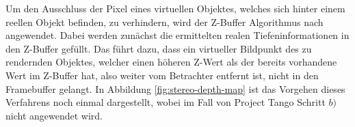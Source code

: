 Um den Ausschluss der Pixel eines virtuellen Objektes, welches sich hinter einem reellen Objekt befinden, zu verhindern, wird der Z-Buffer Algorithmus nach \citet{greene1993hierarchical} angewendet. Dabei werden zunächst die ermittelten realen Tiefeninformationen in den Z-Buffer gefüllt. Das führt dazu, dass ein virtueller Bildpunkt des zu rendernden Objektes, welcher einen höheren Z-Wert als der bereits vorhandene Wert im Z-Buffer hat, also weiter vom Betrachter entfernt ist, nicht in den Framebuffer gelangt. In Abbildung \ref{fig:stereo-depth-map} ist das Vorgehen dieses Verfahrens noch einmal dargestellt, wobei im Fall von Project Tango Schritt \(b ) \) nicht angewendet wird. \\


